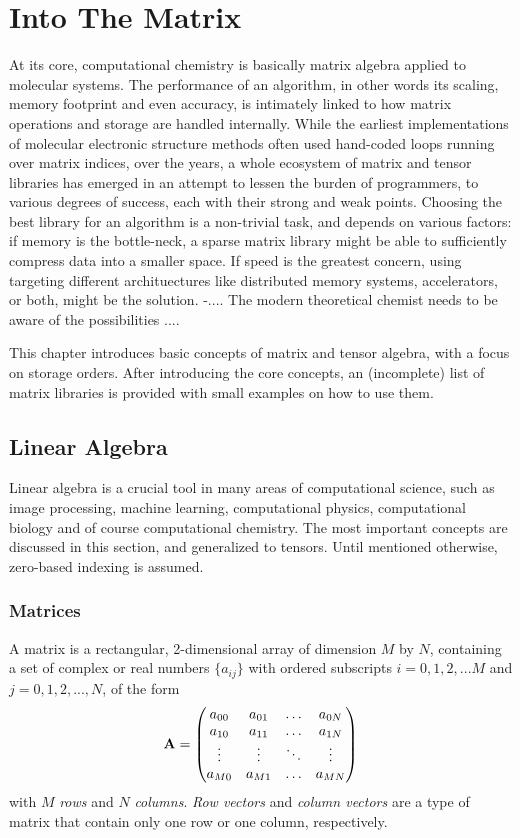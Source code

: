 \chapter{Into The Matrix}

At its core, computational chemistry is basically matrix algebra applied to molecular systems. The performance of an algorithm, in other words its scaling, memory footprint and even accuracy, is intimately linked to how matrix operations and storage are handled internally. While the earliest implementations of molecular electronic structure methods often used hand-coded loops running over matrix indices, over the years, a whole ecosystem of matrix and tensor libraries has emerged in an attempt to lessen the burden of programmers, to various degrees of success, each with their strong and weak points. Choosing the best library for an algorithm is a non-trivial task, and depends on various factors: if memory is the bottle-neck, a sparse matrix library might be able to sufficiently compress data into a smaller space. If speed is the greatest concern, using targeting different archituectures like distributed memory systems, accelerators, or both, might be the solution. -.... The modern theoretical chemist needs to be aware of the possibilities ....

This chapter introduces basic concepts of matrix and tensor algebra, with a focus on storage orders. After introducing the core concepts, an (incomplete) list of matrix libraries is provided with small examples on how to use them. 

\section{Linear Algebra}

Linear algebra is a crucial tool in many areas of computational science, such as image processing, machine learning, computational physics, computational biology and of course computational chemistry. The most important concepts are discussed in this section, and generalized to tensors. Until mentioned otherwise, zero-based indexing is assumed. 

\subsection{Matrices}

A matrix is a rectangular, 2-dimensional array of dimension $M$ by $N$, containing a set of complex or real numbers $\{a_{ij}\}$ with ordered subscripts $i = 0,1,2,...M$ and $j = 0,1,2,...,N$, of the form
\begin{equation}
\mathbf{A} = \begin{pmatrix}
a_{00} & a_{01} & \ldots & a_{0N} \\
a_{10} & a_{11} & \ldots & a_{1N} \\
\vdots & \vdots & \ddots & \vdots \\
a_{M0} & a_{M1} & \ldots & a_{MN}
\end{pmatrix}
\end{equation}
\noindent with $M$ \emph{rows} and $N$ \emph{columns}. \emph{Row vectors} and \emph{column vectors} are a type of matrix that contain only one row or one column, respectively. 

